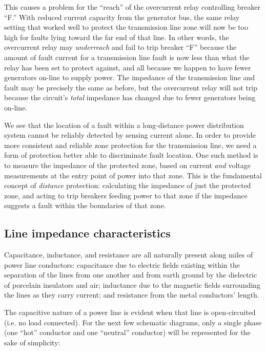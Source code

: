 This causes a problem for the ``reach'' of the overcurrent relay controlling breaker ``F.''  With reduced current capacity from the generator bus, the same relay setting that worked well to protect the transmission line zone will now be too high for faults lying toward the far end of that line.  In other words, the overcurrent relay may \textit{underreach} and fail to trip breaker ``F'' because the amount of fault current for a transmission line fault is now less than what the relay has been set to protect against, and all because we happen to have fewer generators on-line to supply power.  The impedance of the transmission line and fault may be precisely the same as before, but the overcurrent relay will not trip because the circuit's \textit{total} impedance has changed due to fewer generators being on-line.  

We see that the location of a fault within a long-distance power distribution system cannot be reliably detected by sensing current alone.  In order to provide more consistent and reliable zone protection for the transmission line, we need a form of protection better able to discriminate fault location.  One such method is to measure the impedance of the protected zone, based on current \textit{and} voltage measurements at the entry point of power into that zone.  This is the fundamental concept of \textit{distance} protection: calculating the impedance of just the protected zone, and acting to trip breakers feeding power to that zone if the impedance suggests a fault within the boundaries of that zone.




\filbreak
\subsection{Line impedance characteristics}

Capacitance, inductance, and resistance are all naturally present along miles of power line conductors: capacitance due to electric fields existing within the separation of the lines from one another and from earth ground by the dielectric of porcelain insulators and air; inductance due to the magnetic fields surrounding the lines as they carry current; and resistance from the metal conductors' length.  

The capacitive nature of a power line is evident when that line is open-circuited (i.e. no load connected).  For the next few schematic diagrams, only a single phase (one ``hot'' conductor and one ``neutral'' conductor) will be represented for the sake of simplicity:

